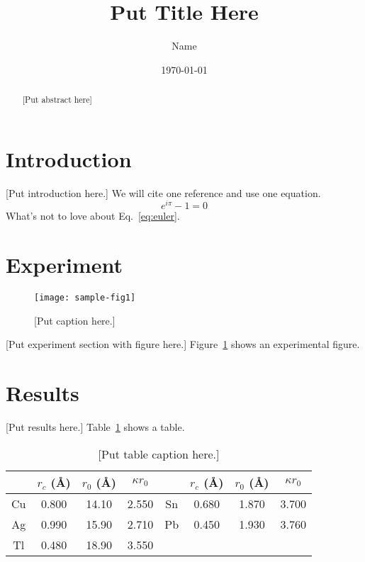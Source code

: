 \documentclass[aps,twocolumn,secnumarabic,balancelastpage,amsmath,amssymb,nofootinbib,hyperref=pdftex]{revtex4}
\begin{document}
\title{Put Title Here}
\author         {Name}
\date{\today}


\begin{abstract}
[Put abstract here]
\end{abstract}

\maketitle


\section{Introduction}

[Put introduction here.]  We will cite one reference\cite{mayfield1998}
and use one equation.
\begin{equation}
e^{i\pi}-1 = 0
\label{eq:euler}
\end{equation}
What's not to love about Eq.~\ref{eq:euler}.

\section{Experiment}

\begin{figure}[htb]
\texttt{[image: sample-fig1]}
\caption{[Put caption here.]\label{fig:samplefig}}
\end{figure}

[Put experiment section with figure here.]  Figure~\ref{fig:samplefig}
shows an experimental figure.  

\section{Results}

[Put results here.]  Table~\ref{tab:table1} shows a table.

\begin{table}[htb]
\caption{\label{tab:table1}[Put table caption here.]}
\begin{ruledtabular}
\begin{tabular}{cccccccc}
 &$r_c$ (\AA)&$r_0$ (\AA)&$\kappa r_0$&
 &$r_c$ (\AA) &$r_0$ (\AA)&$\kappa r_0$\\
\hline
Cu& 0.800 & 14.10 & 2.550 &Sn\footnotemark[1] & 0.680 & 1.870 & 3.700 \\
Ag& 0.990 & 15.90 & 2.710 &Pb\footnotemark[1] & 0.450 & 1.930 & 3.760 \\
Tl& 0.480 & 18.90 & 3.550 & & & & \\
\end{tabular}
\end{ruledtabular}
\end{table}
\end{document}
